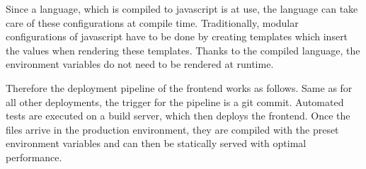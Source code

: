 Since a language, which is compiled to javascript is at use, the language can
take care of these configurations at compile time. Traditionally, modular
configurations of javascript have to be done by creating templates which insert
the values when rendering these templates. Thanks to the compiled language, the
environment variables do not need to be rendered at runtime.

Therefore the deployment pipeline of the frontend works as follows. Same as for
all other deployments, the trigger for the pipeline is a git commit. Automated
tests are executed on a build server, which then deploys the frontend. Once the
files arrive in the production environment, they are compiled with the preset
environment variables and can then be statically served with optimal
performance.
